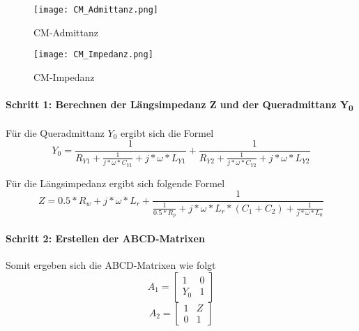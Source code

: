 \begin{figure}[H]
	\begin{minipage}[h]{0.45\linewidth}
		\centering
		\texttt{[image: CM\_Admittanz.png]}
		\label{fig:CM-Admittanz}
		\caption{CM-Admittanz \cite{aufgabenstellung}}
	\end{minipage}
	\hfill
	\begin{minipage}[h]{0.45\linewidth}
	\centering
		\texttt{[image: CM\_Impedanz.png]}
		\caption{CM-Impedanz \cite{aufgabenstellung}}
		\label{fig:CM-Impedanz}
	\end{minipage}
\end{figure}
\paragraph{Schritt 1: Berechnen der Längsimpedanz Z und der Queradmittanz Y\textsubscript{0}}\label{paragraph:schritt1}
Für die Queradmittanz $Y_0$ ergibt sich die Formel
\begin{equation}\label{y_admittance}
Y_0 = \frac{ 1 }{R_{Y1} + \frac{1}{j*\omega*C_{Y1}}+j*\omega*L_{Y1}} +\frac{ 1 }{R_{Y2} + \frac{1}{j*\omega*C_{Y2}}+j*\omega*L_{Y2}}
\end{equation}

Für die Längsimpedanz ergibt sich folgende Formel
\begin{equation}\label{z_impedance}
Z = 0.5*R_w+j*\omega*L_r+\frac{ 1 }{ \frac{1}{0.5*R_p}+j*\omega*L_r*(C_1+C_2)+\frac{1}{j*\omega*L_0} }
\end{equation}

\paragraph{Schritt 2: Erstellen der ABCD-Matrixen}\label{paragraph:schritt2}

Somit ergeben sich die ABCD-Matrixen wie folgt
\begin{equation}\label{equ:abcd_a1}
A_1 =
\left[\begin{matrix}
1 & 0\\ Y_0&1 
\end{matrix}\right]
\end{equation}
\begin{equation}\label{equ:abcd_a2}
A_2 =
\left[\begin{matrix}
1 & Z\\ 0&1 
\end{matrix}\right]
\end{equation}

